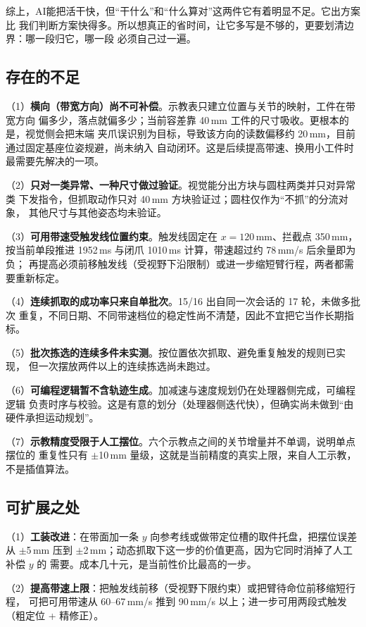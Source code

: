 \documentclass[UTF8,a4paper,zihao=5,fontset=windows]{ctexart}
\begin{document}
综上，AI能把活干快，但“干什么”和“什么算对”这两件它有着明显不足。它出方案比
我们判断方案快得多。所以想真正的省时间，让它多写是不够的，更要划清边界：哪一段归它，哪一段
必须自己过一遍。

\subsection{存在的不足}

（1）\textbf{横向（带宽方向）尚不可补偿}。示教表只建立位置与关节的映射，工件在带宽方向
偏多少，落点就偏多少；当前容差靠 40\,mm 工件的尺寸吸收。更根本的是，视觉侧会把末端
夹爪误识别为目标，导致该方向的读数偏移约 20\,mm，目前通过固定基座位姿规避，尚未纳入
自动闭环。这是后续提高带速、换用小工件时最需要先解决的一项。

（2）\textbf{只对一类异常、一种尺寸做过验证}。视觉能分出方块与圆柱两类并只对异常类
下发指令，但抓取动作只对 40\,mm 方块验证过；圆柱仅作为“不抓”的分流对象，
其他尺寸与其他姿态均未验证。

（3）\textbf{可用带速受触发线位置约束}。触发线固定在 $x=120$\,mm、拦截点 350\,mm，
按当前单段推进 1952\,ms 与闭爪 1010\,ms 计算，带速超过约 78\,mm/s 后余量即为负；
再提高必须前移触发线（受视野下沿限制）或进一步缩短臂行程，两者都需要重新标定。

（4）\textbf{连续抓取的成功率只来自单批次}。15/16 出自同一次会话的 17 轮，未做多批次
重复，不同日期、不同带速档位的稳定性尚不清楚，因此不宜把它当作长期指标。

（5）\textbf{批次拣选的连续多件未实测}。按位置依次抓取、避免重复触发的规则已实现，
但一次摆放两件以上的连续拣选尚未跑过。

（6）\textbf{可编程逻辑暂不含轨迹生成}。加减速与速度规划仍在处理器侧完成，可编程逻辑
负责时序与校验。这是有意的划分（处理器侧迭代快），但确实尚未做到“由硬件承担运动规划”。

（7）\textbf{示教精度受限于人工摆位}。六个示教点之间的关节增量并不单调，说明单点摆位的
重复性只有 $\pm$10\,mm 量级，这就是当前精度的真实上限，来自人工示教，不是插值算法。

\subsection{可扩展之处}

（1）\textbf{工装改进}：在带面加一条 $y$ 向参考线或做带定位槽的取件托盘，把摆位误差从
$\pm$5\,mm 压到 $\pm$2\,mm；动态抓取下这一步的价值更高，因为它同时消掉了人工补偿 $y$ 的
需要。成本几十元，是当前性价比最高的一步。

（2）\textbf{提高带速上限}：把触发线前移（受视野下限约束）或把臂待命位前移缩短行程，
可把可用带速从 60--67\,mm/s 推到 90\,mm/s 以上；进一步可用两段式触发（粗定位 + 精修正）。
\end{document}
